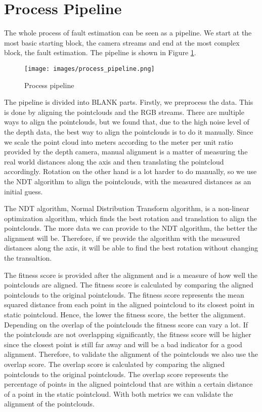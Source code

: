 \section{Process Pipeline}

The whole process of fault estimation can be seen as a pipeline. We start at the most basic starting block, the camera streams and end at the most complex block, the fault estimation. The pipeline is shown in Figure \ref{fig:process_pipeline}.

\begin{figure}[ht]
    \centering
    \texttt{[image: images/process\_pipeline.png]}
    \caption{Process pipeline}
    \label{fig:process_pipeline}
\end{figure}

The pipeline is divided into BLANK parts. Firstly, we preprocess the data. This is done by aligning the pointclouds and the RGB streams. There are multiple ways to align the pointclouds, but we found that, due to the high noise level of the depth data, the best way to align the pointclouds is to do it manually. Since we scale the point cloud into meters according to the meter per unit ratio provided by the depth camera, manual alignment is a matter of measuring the real world distances along the axis and then translating the pointcloud accordingly. Rotation on the other hand is a lot harder to do manually, so we use the NDT algorithm to align the pointclouds, with the measured distances as an initial guess. 

The NDT algorithm, Normal Distribution Transform algorithm, is a non-linear optimization algorithm, which finds the best rotation and translation to align the pointclouds\cite{NDT}. The more data we can provide to the NDT algorithm, the better the alignment will be. Therefore, if we provide the algorithm with the measured distances along the axis, it will be able to find the best rotation without changing the transaltion.

The fitness score is provided after the alignment and is a measure of how well the pointclouds are aligned. The fitness score is calculated by comparing the aligned pointclouds to the original pointclouds. The fitness score represents the mean squared distance from each point in the aligned pointcloud to its closest point in static pointcloud. Hence, the lower the fitness score, the better the alignment. Depending on the overlap of the pointclouds the fitness score can vary a lot. If the pointclouds are not overlapping significantly, the fitness score will be higher since the closest point is still far away and will be a bad indicator for a good alignment. Therefore, to validate the alignment of the pointclouds we also use the overlap score. The overlap score is calculated by comparing the aligned pointclouds to the original pointclouds. The overlap score represents the percentage of points in the aligned pointcloud that are within a certain distance of a point in the static pointcloud. With both metrics we can validate the alignment of the pointclouds.

